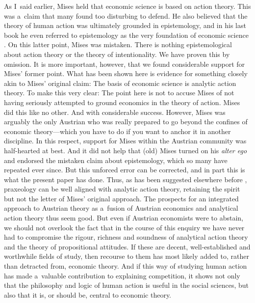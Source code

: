 As I~said earlier, Mises held that economic science is based on action theory. This was a~claim that many found too disturbing to defend. He also believed that the theory of human action was ultimately grounded in epistemology, and in his last book he even referred to epistemology as the very foundation of economic science 
\parencite[][]{mises_ultimate_1962}. %
 On this latter point, Mises was mistaken. There is nothing epistemological about action theory or the theory of intentionality. We have proven this by omission. It is more important, however, that we found considerable support for Mises' former point. What has been shown here is evidence for something closely akin to Mises' original claim: The basis of economic science is analytic action theory. To make this very clear: The point here is not to accuse Mises of not having seriously attempted to ground economics in the theory of action. Mises did this like no other. And with considerable success. However, Mises was arguably the only Austrian who was really prepared to go beyond the confines of economic theory---which you have to do if you want to anchor it in another discipline. In this respect, support for Mises within the Austrian community was half-hearted at best. And it did not help that (old) Mises turned on his \textit{alter ego} and endorsed the mistaken claim about epistemology, which so many have repeated ever since. But this unforced error can be corrected, and in part this is what the present paper has done. Thus, as has been suggested elsewhere before 
\parencite[cf.][]{oliva_cordoba_uneasiness_2017}, %
 praxeology can be well aligned with analytic action theory, retaining the spirit but not the letter of Mises' original approach. The prospects for an integrated approach to Austrian theory as a~fusion of Austrian economics and analytical action theory thus seem good. But even if Austrian economists were to abstain, we should not overlook the fact that in the course of this enquiry we have never had to compromise the rigour, richness and soundness of analytical action theory and the theory of propositional attitudes. If these are decent, well-established and worthwhile fields of study, then recourse to them has most likely added to, rather than detracted from, economic theory. And if this way of studying human action has made a~valuable contribution to explaining competition, it shows not only that the philosophy and logic of human action is useful in the social sciences, but also that it is, or should be, central to economic theory.



